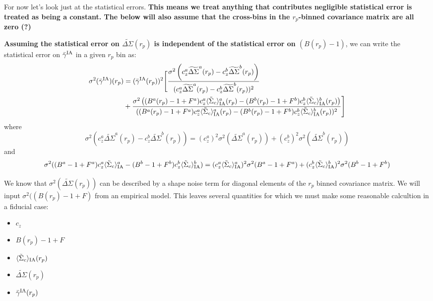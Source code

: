 \documentclass[onecolumn,amsmath,aps,fleqn, superscriptaddress]{revtex4}
\begin{document}
For now let's look just at the statistical errors. {\bf This means we treat anything that contributes negligible statistical error is treated as being a constant. The below will also assume that the cross-bins in the $r_p$-binned covariance matrix are all zero (?)}

{\bf Assuming the statistical error on $\widetilde{\Delta\Sigma}(r_p)$ is independent of the statistical error on $(B(r_p)-1)$}, we can write the statistical error on $\bar{\gamma}^{\rm IA}$ in a given $r_p$ bin as:
\begin{align}
\sigma^2(\bar{\gamma}^{\rm IA})(r_p) &= (\bar{\gamma}^{\rm IA}(r_p))^2 \Bigg[\frac{\sigma^2\left(c_z^a \widetilde{\Delta\Sigma}^a(r_p)  - c_z^b \widetilde{\Delta\Sigma}^b(r_p)\right)}{(c_z^a \widetilde{\Delta\Sigma}^a(r_p)  - c_z^b \widetilde{\Delta\Sigma}^b(r_p))^2} \nonumber \\ &+ \frac{\sigma^2\left((B^a(r_p)-1+F^a)c_z^a \langle \tilde{\Sigma}_c\rangle_{\rm IA}^a(r_p) - (B^b(r_p)-1+F^b)c_z^b \langle \tilde{\Sigma}_c\rangle_{\rm IA}^b(r_p)\right)}{((B^a(r_p)-1+F^a)c_z^a \langle \tilde{\Sigma}_c\rangle_{\rm IA}^a(r_p) - (B^b(r_p)-1+F^b)c_z^b \langle \tilde{\Sigma}_c\rangle_{\rm IA}^b(r_p))^2} \Bigg] 
\label{siggam}
\end{align}
where
\begin{equation}
\sigma^2(c_z^a \widetilde{\Delta\Sigma}^a(r_p)  - c_z^b \widetilde{\Delta\Sigma}^b(r_p)) = (c_z^a)^2  \sigma^2 (\widetilde{\Delta\Sigma}^a(r_p)) + (c_z^b)^2\sigma^2(\widetilde{\Delta\Sigma}^b(r_p))
\label{sigtop}
\end{equation}
and 
\begin{equation}
\sigma^2((B^a-1+F^a)c_z^a \langle \tilde{\Sigma}_c\rangle_{\rm IA}^a - (B^b-1+F^b)c_z^b \langle \tilde{\Sigma}_c\rangle_{\rm IA}^b) = (c_z^a \langle \tilde{\Sigma}_c\rangle_{\rm IA}^a)^2 \sigma^2(B^a-1+F^a) + (c_z^b \langle \tilde{\Sigma}_c\rangle_{\rm IA}^b)^2 \sigma^2(B^b-1+F^b)
\label{sigbottom}
\end{equation}

We know that $\sigma^2(\widetilde{\Delta\Sigma}(r_p))$ can be described by a shape noise term for diagonal elements of the $r_p$ binned covariance matrix. We will input $\sigma^2((B(r_p)-1+F)$ from an empirical model. This leaves several quantities for which we must make some reasonable calcultion in a fiducial case:
\begin{itemize}
\item{$c_z$}
\item{$B(r_p)-1+F$ }
\item{$\langle \tilde{\Sigma}_c\rangle_{\rm IA}(r_p)$}
\item{$\widetilde{\Delta\Sigma}(r_p)$ }
\item{$\bar{\gamma}^{\rm IA}(r_p)$ }
\end{itemize}
\end{document}
